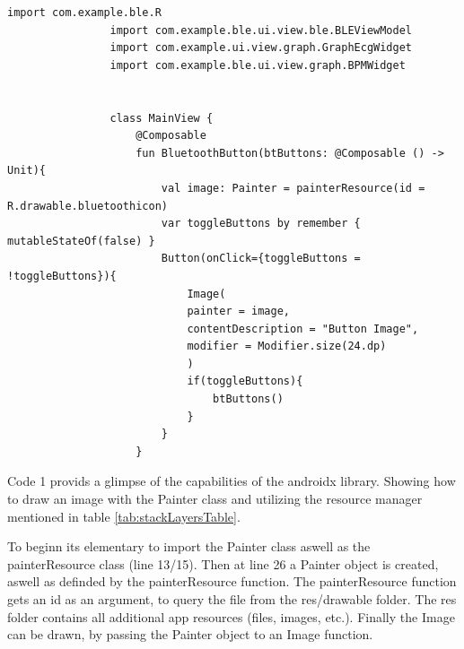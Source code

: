 {\begin{lstlisting}[label={fig:simpleSourceGen.cs}, caption={Android Java API exmaple with androidx}]
				import com.example.ble.R
				import com.example.ble.ui.view.ble.BLEViewModel
				import com.example.ui.view.graph.GraphEcgWidget
				import com.example.ble.ui.view.graph.BPMWidget
				
				
				class MainView {
					@Composable
					fun BluetoothButton(btButtons: @Composable () -> Unit){
						val image: Painter = painterResource(id = R.drawable.bluetoothicon)
						var toggleButtons by remember { mutableStateOf(false) }
						Button(onClick={toggleButtons = !toggleButtons}){
							Image(
							painter = image,
							contentDescription = "Button Image",
							modifier = Modifier.size(24.dp)
							)
							if(toggleButtons){
								btButtons()
							}
						}
					}
			\end{lstlisting}
			
			
			Code 1 provids a glimpse of the capabilities of the androidx library. Showing how to draw an image with the Painter class and utilizing the resource manager mentioned in table \ref{tab:stackLayersTable}.
		
			To beginn its elementary to import the Painter class aswell as the painterResource class (line 13/15).  Then at line 26 a Painter object is created, aswell as definded by the painterResource function. The painterResource function gets an id as an argument, to query the file from the res/drawable folder. The res folder contains all additional app resources (files, images, etc.). Finally the Image can be drawn, by passing the Painter object to an Image function.
			
	}
